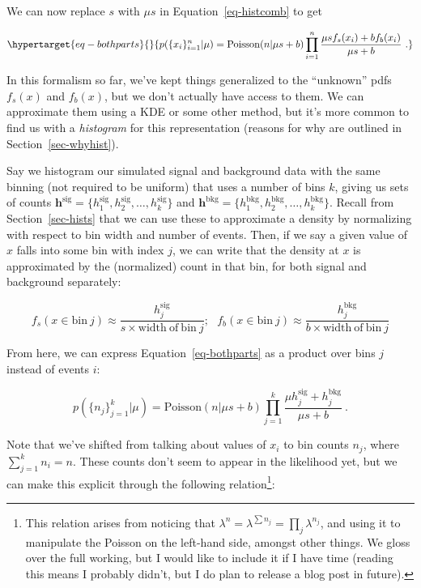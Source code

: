 \documentclass[
  11pt,
  numbers=noendperiod]{book}
\begin{document}
We can now replace \(s\) with \(\mu s\) in Equation~\ref{eq-histcomb} to
get

\begin{equation}\protect\hypertarget{eq-bothparts}{}{
p(\{x_i\}_{i=1}^n | \mu) = \mathrm{Poisson}(n|\mu s+b)\prod_{i=1}^n\frac{\mu sf_s(x_i) + bf_b(x_i)}{\mu s+b}~.
}\label{eq-bothparts}\end{equation}

In this formalism so far, we've kept things generalized to the
``unknown'' pdfs \(f_s(x)\) and \(f_b(x)\), but we don't actually have
access to them. We can approximate them using a KDE or some other
method, but it's more common to find us with a \emph{histogram} for this
representation (reasons for why are outlined in
Section~\ref{sec-whyhist}).

Say we histogram our simulated signal and background data with the same
binning (not required to be uniform) that uses a number of bins \(k\),
giving us sets of counts
\(\mathbf{h}^{\mathrm{sig}} = \{h_1^{\mathrm{sig}}, h_2^{\mathrm{sig}}, \dots, h_k^{\mathrm{sig}}\}\)
and
\(\mathbf{h}^{\mathrm{bkg}} = \{h_1^{\mathrm{bkg}}, h_2^{\mathrm{bkg}}, \dots, h_k^{\mathrm{bkg}}\}\).
Recall from Section~\ref{sec-hists} that we can use these to approximate
a density by normalizing with respect to bin width and number of events.
Then, if we say a given value of \(x\) falls into some bin with index
\(j\), we can write that the density at \(x\) is approximated by the
(normalized) count in that bin, for both signal and background
separately:

\[
f_s(x \in \mathrm{bin~}j) \approx \frac{h^{\mathrm{sig}}_j}{s\times\mathrm{width~of~bin}~j};~~~f_b(x \in \mathrm{bin~}j ) \approx \frac{h^{\mathrm{bkg}}_j}{b\times\mathrm{width~of~bin}~j}
\]

From here, we can express Equation~\ref{eq-bothparts} as a product over
bins \(j\) instead of events \(i\):

\[
p(\{n_j\}_{j=1}^k | \mu) = \mathrm{Poisson}(n|\mu s+b)\prod_{j=1}^k\frac{\mu h^{\mathrm{sig}}_j  + h^{\mathrm{bkg}}_j}{\mu s+b}~.
\]

Note that we've shifted from talking about values of \(x_i\) to bin
counts \(n_j\), where \(\sum_{j=1}^k n_i = n\). These counts don't seem
to appear in the likelihood yet, but we can make this explicit through
the following relation\footnote{This relation arises from noticing that
  \(\lambda^n = \lambda^{\sum n_j} = \prod_j \lambda^{n_j}\), and using
  it to manipulate the Poisson on the left-hand side, amongst other
  things. We gloss over the full working, but I would like to include it
  if I have time (reading this means I probably didn't, but I do plan to
  release a blog post in future).}:
\end{document}
